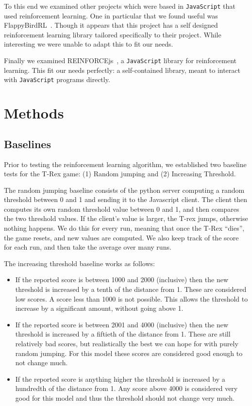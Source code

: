 \documentclass{scrartcl}
\begin{document}
To this end we examined other projects which were based in \texttt{JavaScript}
that used reinforcement learning. One in particular that we found useful was
FlappyBirdRL~\cite{flappybirdrl}. Though it appears that this project has a self
designed reinforcement learning library tailored specifically to their project.
While interesting we were unable to adapt this to fit our needs.

Finally we examined REINFORCEjs~\cite{reinforcejs}, a \texttt{JavaScript}
library for reinforcement learning. This fit our needs perfectly: a
self-contained library, meant to interact with \texttt{JavaScript} programs
directly.
\nocite{rlblogex}

\section{Methods}

    \subsection{Baselines}\label{ssec:baselines}
    Prior to testing the reinforcement learning algorithm, we established two baseline tests for
    the T-Rex game: (1) Random jumping and (2) Increasing Threshold.

    \par The random jumping baseline consists of the python server computing a random threshold
     between 0 and 1 and sending it to the Javascript client. The client then computes its own
     random threshold value between 0 and 1, and then compares the two threshold values. If the
     client's value is larger, the T-rex jumps, otherwise nothing happens. We do this for every
     run, meaning that once the T-Rex ``dies'', the game resets, and new values are computed. We
     also keep track of the score for each run, and then take the average over many runs.


    \par The increasing threshold baseline works as follows:

    \begin{itemize}
      \item If the reported score is between 1000 and 2000 (inclusive) then the new
        threshold is increased by a tenth of the distance from 1. These are
        considered low scores. A score less than 1000 is not possible. This allows
        the threshold to increase by a significant amount, without going above 1.
      \item If the reported score is between 2001 and 4000 (inclusive) then the new
        threshold is increased by a fiftieth of the distance from 1. These are still
        relatively bad scores, but realistically the best we can hope for with
        purely random jumping. For this model these scores are considered good
        enough to not change much.
      \item If the reported score is anything higher the threshold is increased by a
        hundredth of the distance from 1. Any score above 4000 is considered very
        good for this model and thus the threshold should not change very much.
    \end{itemize}
\end{document}
